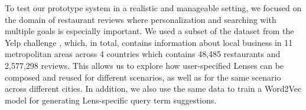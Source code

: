 \documentclass{sigchi}
\begin{document}
    
    




To test our prototype system in a realistic and manageable setting, we focused on the domain of restaurant reviews where personalization and searching with multiple goals is especially important. We used a subset of the dataset from the Yelp challenge \cite{yelpdata}, which, in total, contains information about local business in 11 metropolitan areas across 4 countries which contains 48,485 restaurants and 2,577,298 reviews. This allows us to explore how user-specified Lenses can be composed and reused for different scenarios, as well as for the same scenario across different cities. In addition, we also use the same data to train a Word2Vec model \cite{mikolov2013efficient} for generating Lens-specific query term suggestions.
\end{document}
